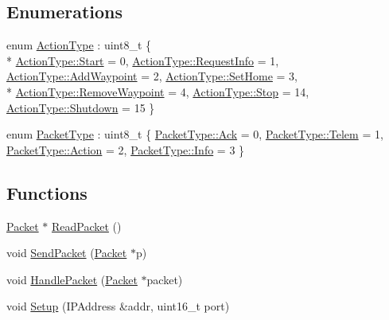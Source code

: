 \subsection*{Enumerations}
\begin{DoxyCompactItemize}
\item 
enum \hyperlink{namespace_protocol_a95f2e35dc2d8d920f0d7ddaaf122c3b9}{Action\+Type} \+: uint8\+\_\+t \{ \\*
\hyperlink{namespace_protocol_a95f2e35dc2d8d920f0d7ddaaf122c3b9aa6122a65eaa676f700ae68d393054a37}{Action\+Type\+::\+Start} = 0, 
\hyperlink{namespace_protocol_a95f2e35dc2d8d920f0d7ddaaf122c3b9ad688f865d336b65f4de574e314ebcf3f}{Action\+Type\+::\+Request\+Info} = 1, 
\hyperlink{namespace_protocol_a95f2e35dc2d8d920f0d7ddaaf122c3b9ae68373c55e2e3d2b783403fba58c7327}{Action\+Type\+::\+Add\+Waypoint} = 2, 
\hyperlink{namespace_protocol_a95f2e35dc2d8d920f0d7ddaaf122c3b9ad127d07d13bd85cec9997691b4eec0d4}{Action\+Type\+::\+Set\+Home} = 3, 
\\*
\hyperlink{namespace_protocol_a95f2e35dc2d8d920f0d7ddaaf122c3b9a6a758440fe37f8e3c863f340eb267c5b}{Action\+Type\+::\+Remove\+Waypoint} = 4, 
\hyperlink{namespace_protocol_a95f2e35dc2d8d920f0d7ddaaf122c3b9a11a755d598c0c417f9a36758c3da7481}{Action\+Type\+::\+Stop} = 14, 
\hyperlink{namespace_protocol_a95f2e35dc2d8d920f0d7ddaaf122c3b9a1a4ebb180ba59b067782515ffee6e975}{Action\+Type\+::\+Shutdown} = 15
 \}
\item 
enum \hyperlink{namespace_protocol_a0704fe3e36f425dc9805a6dcc1ea1b75}{Packet\+Type} \+: uint8\+\_\+t \{ \hyperlink{namespace_protocol_a0704fe3e36f425dc9805a6dcc1ea1b75ab25d8b2099e52bb9300aca6661601b8b}{Packet\+Type\+::\+Ack} = 0, 
\hyperlink{namespace_protocol_a0704fe3e36f425dc9805a6dcc1ea1b75a5f221e9a2771c63ef7f696975f16cea4}{Packet\+Type\+::\+Telem} = 1, 
\hyperlink{namespace_protocol_a0704fe3e36f425dc9805a6dcc1ea1b75a004bf6c9a40003140292e97330236c53}{Packet\+Type\+::\+Action} = 2, 
\hyperlink{namespace_protocol_a0704fe3e36f425dc9805a6dcc1ea1b75a4059b0251f66a18cb56f544728796875}{Packet\+Type\+::\+Info} = 3
 \}
\end{DoxyCompactItemize}
\subsection*{Functions}
\begin{DoxyCompactItemize}
\item 
\hyperlink{class_protocol_1_1_packet}{Packet} $\ast$ \hyperlink{namespace_protocol_a1bc281284688ad6b57162dbefd3b7b84}{Read\+Packet} ()
\item 
void \hyperlink{namespace_protocol_a9fbc73a47067bdd531b5435b4865da47}{Send\+Packet} (\hyperlink{class_protocol_1_1_packet}{Packet} $\ast$p)
\item 
void \hyperlink{namespace_protocol_ae4715844a15b4cef94c06d21a9bce30a}{Handle\+Packet} (\hyperlink{class_protocol_1_1_packet}{Packet} $\ast$packet)
\item 
void \hyperlink{namespace_protocol_a15ee711eaba2f00333d798eaa3e6e55b}{Setup} (I\+P\+Address \&addr, uint16\+\_\+t port)
\end{DoxyCompactItemize}


